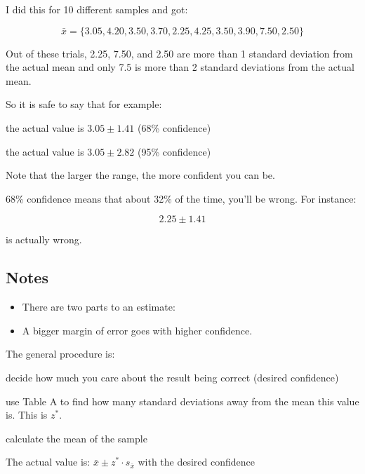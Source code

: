 \documentclass[landscape]{exam}
\begin{document}
  I did this for 10 different samples and got:

  \[
    \bar{x} = \{ 3.05, 4.20, 3.50, 3.70, 2.25, 4.25, 3.50, 3.90, 7.50, 2.50 \}
  \]

  Out of these trials, 2.25, 7.50, and 2.50 are more than 1 standard deviation
  from the actual mean and only 7.5 is more than 2 standard deviations from the
  actual mean.

  So it is safe to say that for example:
  \begin{itemize*}
    \item the actual value is $3.05 \pm 1.41$ (68\% confidence)
    \item the actual value is $3.05 \pm 2.82$ (95\% confidence)
  \end{itemize*}

  Note that the larger the range, the more confident you can be. 
  
  68\% confidence means that about 32\% of the time, you'll be wrong. For
  instance:

  \[
    2.25 \pm 1.41
  \] 

  is actually wrong.

  \subsection{Notes}

  \begin{itemize}
    \item There are two parts to an estimate:

    \item A bigger margin of error goes with higher confidence.

  \end{itemize}

  The general procedure is:
  \begin{enumerate*}
    \item decide how much you care about the result being correct (desired
      confidence)

    \item use Table A to find how many standard deviations away from the mean
      this value is. This is $z^*$.

    \item calculate the mean of the sample

    \item The actual value is: $\bar{x} \pm z^* \cdot s_{\bar{x}}$ with the
      desired confidence

  \end{enumerate*}
\end{document}
